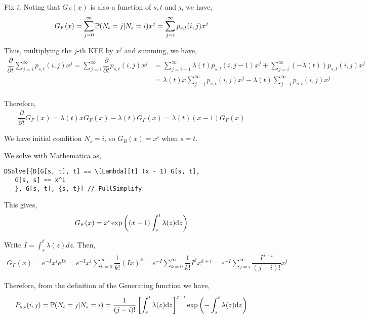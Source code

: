 \begin{solution}[Solution]
Fix \( i \). Noting that \( G_F(x) \) is also a function of \( s,t \) and \( j \), we have,
\begin{align*}
    G_F(x) = \sum_{j=0}^{\infty} \mathbb{P}(N_t = j | N_s = i) x^{j} = \sum_{j=i}^{\infty}p_{s,t}(i,j) x^{j} 
\end{align*}

Thus, multiplying the \( j \)-th KFE by \( x^j \) and summing, we have,
\begin{align*}
    \dfrac{\partial}{\partial t} \sum_{j=i}^{\infty} p_{s,t}(i,j)x^{j}
    =\sum_{j=i}^{\infty} \dfrac{\partial}{\partial t} p_{s,t}(i,j)x^j 
    &= \sum_{j=i+1}^{\infty} \lambda(t) p_{s,t}(i,j-1) x^{j} + \sum_{j=i}^{\infty} (-\lambda(t)) p_{s,t}(i,j) x^j \\
    &= \lambda(t) x\sum_{j=i}^{\infty} p_{s,t}(i,j) x^{j} -\lambda(t) \sum_{j=i}^{\infty} p_{s,t}(i,j) x^j \\
\end{align*}

Therefore,
\begin{align*}
    \dfrac{\partial}{\partial t} G_{F}(x) 
    = \lambda(t) x G_{F}(x) - \lambda(t) G_{F}(x) 
    = \lambda(t) (x-1)G_{F}(x)
\end{align*}

We have initial condition \( N_s = i \), so \( G_B(x) = x^i \) when \( s=t \). 

We solve with Mathematica as,
\begin{lstlisting}
DSolve[{D[G[s, t], t] == \[Lambda][t] (x - 1) G[s, t],
   G[s, s] == x^i
   }, G[s, t], {s, t}] // FullSimplify
\end{lstlisting}

This gives,
\begin{align*}
    G_F(x) = x^i\exp \left( (x-1) \int_{s}^{t}\lambda(z)\mathrm{d} z \right)
\end{align*}

Write \( I = \int_{s}^{t}\lambda(z)dz \). Then,
\begin{align*}
    G_F(x) = e^{-I} x^i e^{Ix} = e^{-I} x^i \sum_{k=0}^{\infty} \dfrac{1}{k!}(Ix)^k 
    = e^{-I} \sum_{k=0}^{\infty}\dfrac{1}{k!}I^kx^{k+i} 
    = e^{-I} \sum_{j=i}^{\infty} \dfrac{I^{j-i}}{(j-i)!}x^{j}
\end{align*}

Therefore, from the definition of the Generating function we have,
\begin{align*}
    P_{s,t}(i,j) 
    = \mathbb{P}(N_t=j | N_s = i) 
    =  \dfrac{1}{(j-i)!} \left[ \int_{s}^{t}\lambda(z)\mathrm{d} z \right]^{j-i}\exp \left( -\int_{s}^{t} \lambda(z)\mathrm{d} z \right)
\end{align*}




\end{solution}
